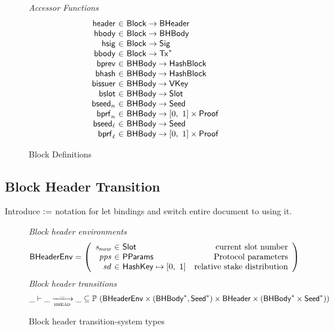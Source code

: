 \begin{figure*}[htb]
  \emph{Accessor Functions}
  \begin{equation*}
    \begin{array}{r@{~\in~}lr}
      \fun{header} & \Block \to \BHeader \\
      \fun{hbody} & \Block \to \BHBody \\
      \fun{hsig} & \Block \to \Sig\\
      \fun{bbody} & \Block \to \seqof{\Tx} \\
      \fun{bprev} & \BHBody \to \HashBlock\\
      \fun{bhash} & \BHBody \to \HashBlock\\
      \fun{bissuer} & \BHBody \to \VKey\\
      \fun{bslot} & \BHBody \to \Slot\\
      \fun{bseed}_n & \BHBody \to \Seed\\
      \fun{bprf}_n & \BHBody \to \unitInterval\times\Proof\\
      \fun{bseed}_\ell & \BHBody \to \Seed\\
      \fun{bprf}_\ell & \BHBody \to \unitInterval\times\Proof\\
    \end{array}
  \end{equation*}
  \caption{Block Definitions}
  \label{fig:defs:blocks}
\end{figure*}

\clearpage

\subsection{Block Header Transition}
\label{sec:block-header-trans}

\begin{todo}
  Introduce $\mathrel{\mathop:}=$ notation for let bindings and
  switch entire document to using it.
\end{todo}

\begin{figure}[ht]
  \emph{Block header environments}
  \begin{equation*}
    \BHeaderEnv =
    \left(
      \begin{array}{r@{~\in~}lr}
        \var{s_{now}} & \Slot & \text{current slot number} \\
        \var{pps} & \PParams & \text{Protocol parameters} \\
        \var{sd} & \HashKey\mapsto\unitInterval & \text{relative stake distribution}\\
      \end{array}
    \right)
  \end{equation*}
  \emph{Block header transitions}
  \begin{equation*}
    \_ \vdash \var{\_} \trans{bhead}{\_} \var{\_} \subseteq
    \powerset (\BHeaderEnv \times (\seqof{\BHBody}, \seqof{\Seed}) \times \BHeader
    \times (\seqof{\BHBody}\times\seqof{\Seed}))
  \end{equation*}
  \caption{Block header transition-system types}
  \label{fig:ts-types:header}
\end{figure}

